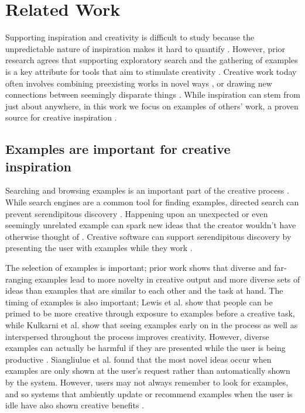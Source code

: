 \section{Related Work}
Supporting inspiration and creativity is difficult to study because the unpredictable nature of inspiration makes it hard to quantify \cite{Shneiderman2007}. However, prior research agrees that supporting exploratory search and the gathering of examples is a key attribute for tools that aim to stimulate creativity \cite{Shneiderman2007, Shneiderman2002, Muller-Wienbergen2011, Greene2002, Bawden1986}. Creative work today often involves combining preexisting works in novel ways \cite{Benjamin2014}, or drawing new connections between seemingly disparate things \cite{Foster2003}. While inspiration can stem from just about anywhere, in this work we focus on examples of others' work, a proven source for creative inspiration \cite{Benjamin2014, Foster2003}.

\subsection{Examples are important for creative inspiration}
Searching and browsing examples is an important part of the creative process \cite{Shneiderman2002, Shneiderman2007, Greene2002, Herring2009, Muller-Wienbergen2011, Bawden1986}. 
While search engines are a common tool for finding examples, directed search can prevent serendipitous discovery \cite{Benjamin2014}. Happening upon an unexpected or even seemingly unrelated example can spark new ideas that the creator wouldn't have otherwise thought of \cite{Erdelez1999, Benjamin2014}.
Creative software can support serendipitous discovery by presenting the user with examples while they work \cite{Bawden1986, Kulkarni, Herring2009}.

The selection of examples is important; prior work shows that diverse and far-ranging examples lead to more novelty in creative output \cite{Chan2011} and more diverse sets of ideas \cite{Siangliulue2015a} than examples that are similar to each other and the task at hand. The timing of examples is also important; Lewis et al. \cite{Lewis2011} show that people can be primed to be more creative through exposure to examples before a creative task, while Kulkarni et al. \cite{Kulkarni} show that seeing examples early on in the process as well as interspersed throughout the process improves creativity. However, diverse examples can actually be harmful if they are presented while the user is being productive \cite{Chan2017}. Siangliulue et al. \cite{Siangliulue2015} found that the most novel ideas occur when examples are only shown at the user's request rather than automatically shown by the system. However, users may not always remember to look for examples, and so systems that ambiently update or recommend examples when the user is idle have also shown creative benefits \cite{Siangliulue2015, Rhodes1996}.

